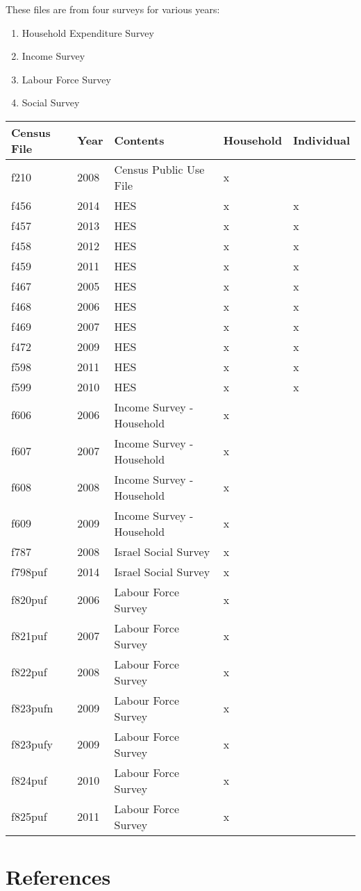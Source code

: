 \documentclass[12pt,twoside]{reedthesis}
\providecommand{\tightlist}{%
  \setlength{\itemsep}{0pt}\setlength{\parskip}{0pt}}
\begin{document}
  These files are from four surveys for various years:
  
  \begin{enumerate}
  \def\labelenumi{\arabic{enumi}.}
  \tightlist
  \item
    Household Expenditure Survey
  \item
    Income Survey
  \item
    Labour Force Survey
  \item
    Social Survey
  \end{enumerate}
  
  \begin{longtable}[]{@{}lllll@{}}
  \toprule
  Census File & Year & Contents & Household & Individual\tabularnewline
  \midrule
  \endhead
  f210 & 2008 & Census Public Use File & x &\tabularnewline
  f456 & 2014 & HES & x & x\tabularnewline
  f457 & 2013 & HES & x & x\tabularnewline
  f458 & 2012 & HES & x & x\tabularnewline
  f459 & 2011 & HES & x & x\tabularnewline
  f467 & 2005 & HES & x & x\tabularnewline
  f468 & 2006 & HES & x & x\tabularnewline
  f469 & 2007 & HES & x & x\tabularnewline
  f472 & 2009 & HES & x & x\tabularnewline
  f598 & 2011 & HES & x & x\tabularnewline
  f599 & 2010 & HES & x & x\tabularnewline
  f606 & 2006 & Income Survey - Household & x &\tabularnewline
  f607 & 2007 & Income Survey - Household & x &\tabularnewline
  f608 & 2008 & Income Survey - Household & x &\tabularnewline
  f609 & 2009 & Income Survey - Household & x &\tabularnewline
  f787 & 2008 & Israel Social Survey & x &\tabularnewline
  f798puf & 2014 & Israel Social Survey & x &\tabularnewline
  f820puf & 2006 & Labour Force Survey & x &\tabularnewline
  f821puf & 2007 & Labour Force Survey & x &\tabularnewline
  f822puf & 2008 & Labour Force Survey & x &\tabularnewline
  f823pufn & 2009 & Labour Force Survey & x &\tabularnewline
  f823pufy & 2009 & Labour Force Survey & x &\tabularnewline
  f824puf & 2010 & Labour Force Survey & x &\tabularnewline
  f825puf & 2011 & Labour Force Survey & x &\tabularnewline
  \bottomrule
  \end{longtable}
  
  \nocite{*} \backmatter
  
  \chapter{References}\label{references}
  
  \noindent
  
  \setlength{\parindent}{-0.20in} \setlength{\leftskip}{0.20in}
  \setlength{\parskip}{8pt}
  
\end{document}
